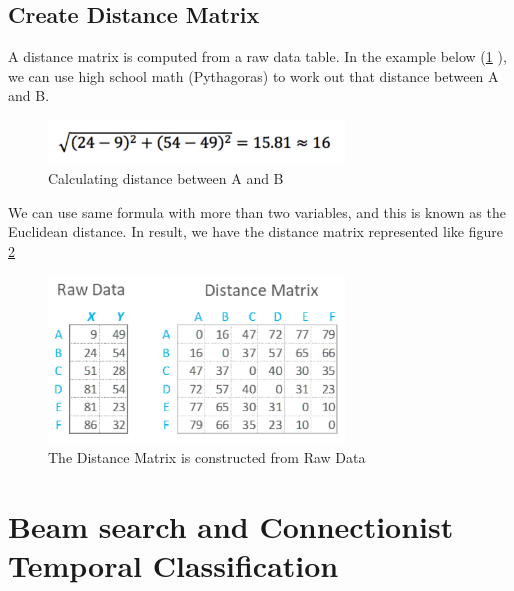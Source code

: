 
    \subsection{ Create Distance Matrix }
      A distance matrix is computed from a raw data table. In the example below (\ref{fig:Chap3-DM_Formula} ), we can use high school math (Pythagoras) to work out 
      that distance between A and B. 

      \begin{figure}[H]
        \centering
        \includegraphics[width=0.7\textwidth]{img/Chap3/DM_Formula}
        \caption{ Calculating distance between A and B}
        \label{fig:Chap3-DM_Formula}
      \end{figure}
      
      We can use same formula with more than two variables, and this is known as 
      the Euclidean distance.
      In result, we have the distance matrix represented like figure \ref{fig:Chap3-DM-Raw}
      \begin{figure}[H]
        \centering
        \includegraphics[width=0.7\textwidth]{img/Chap3/DM-Raw}
        \caption{ The Distance Matrix is constructed from Raw Data }
        \label{fig:Chap3-DM-Raw}
      \end{figure}
      
      \section{ Beam search and Connectionist Temporal Classification }
